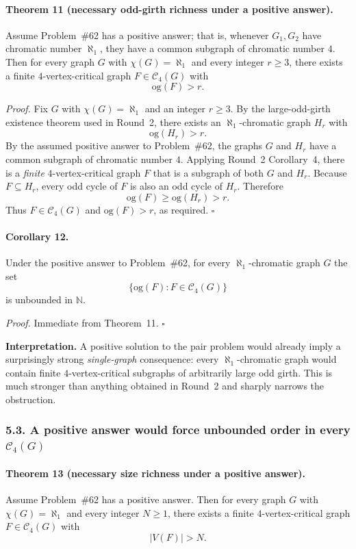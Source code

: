 \paragraph{Theorem 11 (necessary odd-girth richness under a positive answer).}
Assume Problem~\#62 has a positive answer; that is, whenever $G_1,G_2$ have chromatic number $\aleph_1$, they have a common subgraph of chromatic number $4$.
Then for every graph $G$ with $\chi(G)=\aleph_1$ and every integer $r\ge 3$, there exists a finite $4$-vertex-critical graph $F\in \mathcal C_4(G)$ with
\[
\mathrm{og}(F)>r.
\]

\emph{Proof.}
Fix $G$ with $\chi(G)=\aleph_1$ and an integer $r\ge 3$.
By the large-odd-girth existence theorem used in Round~2, there exists an $\aleph_1$-chromatic graph $H_r$ with
\[
\mathrm{og}(H_r)>r.
\]
By the assumed positive answer to Problem~\#62, the graphs $G$ and $H_r$ have a common subgraph of chromatic number $4$.
Applying Round~2 Corollary~4, there is a \emph{finite} $4$-vertex-critical graph $F$ that is a subgraph of both $G$ and $H_r$.
Because $F\subseteq H_r$, every odd cycle of $F$ is also an odd cycle of $H_r$.
Therefore
\[
\mathrm{og}(F)\ge \mathrm{og}(H_r)>r.
\]
Thus $F\in \mathcal C_4(G)$ and $\mathrm{og}(F)>r$, as required.
\hfill$\square$

\paragraph{Corollary 12.}
Under the positive answer to Problem~\#62, for every $\aleph_1$-chromatic graph $G$ the set
\[
\{\mathrm{og}(F):F\in \mathcal C_4(G)\}
\]
is unbounded in $\mathbb N$.

\emph{Proof.}
Immediate from Theorem~11.
\hfill$\square$

\medskip
\noindent\textbf{Interpretation.}
A positive solution to the pair problem would already imply a surprisingly strong \emph{single-graph} consequence: every $\aleph_1$-chromatic graph would contain finite $4$-vertex-critical subgraphs of arbitrarily large odd girth.
This is much stronger than anything obtained in Round~2 and sharply narrows the obstruction.

\subsubsection*{5.3. A positive answer would force unbounded order in every $\mathcal C_4(G)$}

\paragraph{Theorem 13 (necessary size richness under a positive answer).}
Assume Problem~\#62 has a positive answer.
Then for every graph $G$ with $\chi(G)=\aleph_1$ and every integer $N\ge 1$, there exists a finite $4$-vertex-critical graph $F\in \mathcal C_4(G)$ with
\[
|V(F)|>N.
\]

